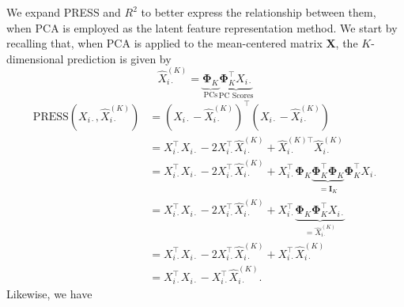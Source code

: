 We expand PRESS and $R^2$ to better express the relationship between them, when PCA is employed as the latent feature representation method. 
We start by recalling that, when PCA is applied to the mean-centered matrix $\mathbf{X}$, the $K$-dimensional prediction is given by 
$$
\widehat{X}^{(K)}_{i\cdot} = \underbrace{\boldsymbol{\Phi}_K}_{\text{PCs}} \underbrace{\boldsymbol{\Phi}_K^\top X_{i\cdot}}_{\text{PC Scores}}
$$
\begin{align*}
    \text{PRESS}\left(X_{i\cdot}, \widehat{X}^{(K)}_{i\cdot}\right) &= \left(X_{i\cdot} - \widehat{X}^{(K)}_{i\cdot}\right)^\top \left(X_{i\cdot} - \widehat{X}^{(K)}_{i\cdot}\right) \\
    &= 
    X_{i\cdot}^\top X_{i\cdot} - 2 X_{i\cdot}^\top \widehat{X}^{(K)}_{i\cdot} + \widehat{X}^{(K)\top}_{i\cdot} \widehat{X}^{(K)}_{i\cdot} \\
    &= X_{i\cdot}^\top X_{i\cdot} - 2 X_{i\cdot}^\top \widehat{X}^{(K)}_{i\cdot} + X_{i\cdot}^\top \boldsymbol{\Phi}_K \underbrace{\boldsymbol{\Phi}_K^\top \boldsymbol{\Phi}_K}_{= \mathbf{I}_K} \boldsymbol{\Phi}_K^\top X_{i\cdot} \\
    &=  X_{i\cdot}^\top X_{i\cdot} - 2 X_{i\cdot}^\top \widehat{X}^{(K)}_{i\cdot} + X_{i\cdot}^\top \underbrace{\boldsymbol{\Phi}_K \boldsymbol{\Phi}_K^\top X_{i\cdot}}_{=\widehat{X}^{(K)}_{i\cdot}} \\
    &= X_{i\cdot}^\top X_{i\cdot} - 2 X_{i\cdot}^\top \widehat{X}^{(K)}_{i\cdot} + X_{i\cdot}^\top \widehat{X}^{(K)}_{i\cdot} \\
    &= X_{i\cdot}^\top X_{i\cdot} - X_{i\cdot}^\top \widehat{X}^{(K)}_{i\cdot}.
\end{align*}
Likewise, we have 
